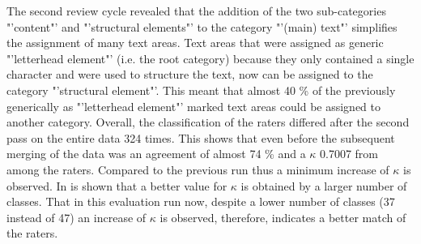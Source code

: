 
The second review cycle revealed that the addition of the two sub-categories "'content"' and "'structural elements"' to the category "'(main) text"' simplifies the assignment of many text areas. Text areas that were assigned as generic "'letterhead element"' (i.e. the root category) because they only contained a single character and were used to structure the text, now can be assigned to the category "'structural element"'. This meant that almost 40 \% of the previously generically as "'letterhead element"' marked text areas could be assigned to another category. Overall, the classification of the raters differed after the second pass on the entire data 324 times. This shows that even before the subsequent merging of the data was an agreement of almost 74 \% and a $\kappa$ 0.7007 from among the raters. Compared to the previous run thus a minimum increase of $\kappa$ is observed. In  is shown that a better value for $\kappa$ is obtained by a larger number of classes. That in this evaluation run now, despite a lower number of classes (37 instead of 47) an increase of $\kappa$ is observed, therefore, indicates a better match of the raters.

